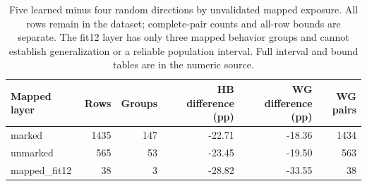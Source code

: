 \begin{table}[t]
\centering\small
\begin{tabular}{lrrrrr}
\toprule
Mapped layer & Rows & Groups & HB difference (pp) & WG difference (pp) & WG pairs \\
\midrule
marked & 1435 & 147 & -22.71 & -18.36 & 1434 \\
unmarked & 565 & 53 & -23.45 & -19.50 & 563 \\
mapped\_fit12 & 38 & 3 & -28.82 & -33.55 & 38 \\
\bottomrule
\end{tabular}
\caption{Five learned minus four random directions by unvalidated mapped exposure. All rows remain in the dataset; complete-pair counts and all-row bounds are separate. The fit12 layer has only three mapped behavior groups and cannot establish generalization or a reliable population interval. Full interval and bound tables are in the numeric source.}
\label{tab:wjb-exposure}
\end{table}
